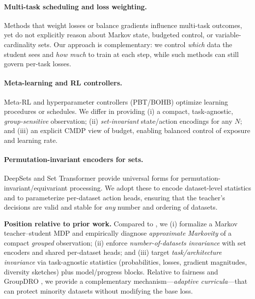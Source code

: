 \documentclass[11pt]{article}
\newcommand{\1}{\mathbf{1}}
\begin{document}
\paragraph{Multi-task scheduling and loss weighting.}
Methods that weight losses or balance gradients \citep{kendall2018uncertainty,chen2018gradnorm} influence multi-task outcomes, yet do not explicitly reason about Markov state, budgeted control, or variable-cardinality sets. Our approach is complementary: we control \emph{which} data the student sees and \emph{how much} to train at each step, while such methods can still govern per-task losses.

\paragraph{Meta-learning and RL controllers.}
Meta-RL \citep{duan2016rl2,finn2017maml} and hyperparameter controllers (PBT/BOHB) \citep{jaderberg2017pbt,falkner2018bohb,snoek2012practical} optimize learning procedures or schedules. We differ in providing (i) a compact, task-agnostic, \emph{group-sensitive} observation; (ii) \emph{set-invariant} state/action encodings for any $N$; and (iii) an explicit CMDP view of budget, enabling balanced control of exposure and learning rate.

\paragraph{Permutation-invariant encoders for sets.}
DeepSets \citep{zaheer2017deepsets} and Set Transformer \citep{lee2019settransformer} provide universal forms for permutation-invariant/equivariant processing. We adopt these to encode dataset-level statistics and to parameterize per-dataset action heads, ensuring that the teacher’s decisions are valid and stable for \emph{any} number and ordering of datasets.

\medskip
\noindent\textbf{Position relative to prior work.}
Compared to \citet{fan2018l2t,wu2018l2tloss}, we (i) formalize a Markov teacher--student MDP and empirically diagnose \emph{approximate Markovity} of a compact \emph{grouped} observation; (ii) enforce \emph{number-of-datasets invariance} with set encoders and shared per-dataset heads; and (iii) target \emph{task/architecture invariance} via task-agnostic statistics (probabilities, losses, gradient magnitudes, diversity sketches) plus model/progress blocks. Relative to fairness and GroupDRO \citep{hashimoto2018fairness,sagawa2020dro}, we provide a complementary mechanism—\emph{adaptive curricula}—that can protect minority datasets without modifying the base loss.
\end{document}

